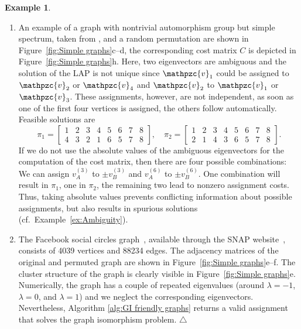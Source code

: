 \documentclass
[
    a4paper,
    DIV=11,
    abstracton
]
{scrartcl}
\newcommand{\mc}[1]{\mathpzc{#1}}
\newcommand\xqed[1]{\leavevmode\unskip\penalty9999 \hbox{}\nobreak\hfill \quad\hbox{#1}}
\newcommand{\exampleSymbol}{\xqed{$\triangle$}}
\theoremstyle{definition}
\newtheorem{example}[theorem]{Example}
\begin{document}
\begin{example}
\begin{enumerate}[leftmargin=0em,itemindent=1.7em,labelsep=0.3em,label=\roman*)]
\item An example of a graph with nontrivial automorphism group but simple spectrum, taken from \cite{FS15}, and a random permutation are shown in Figure~\ref{fig:Simple graphs}c--d, the corresponding cost matrix $ C $ is depicted in Figure~\ref{fig:Simple graphs}h. Here, two eigenvectors are ambiguous and the solution of the LAP is not unique since $ \mc{v}_1 $ could be assigned to $ \mc{v}_2 $ or $ \mc{v}_4 $ and $ \mc{v}_2 $ to $ \mc{v}_1 $ or $ \mc{v}_3 $. These assignments, however, are not independent, as soon as one of the first four vertices is assigned, the others follow automatically. Feasible solutions are
\begin{equation*}
    \pi_1 =
    \begin{bmatrix}
        1 & 2 & 3 & 4 & 5 & 6 & 7 & 8 \\
        4 & 3 & 2 & 1 & 6 & 5 & 7 & 8
    \end{bmatrix}, \quad
    \pi_2 =
    \begin{bmatrix}
        1 & 2 & 3 & 4 & 5 & 6 & 7 & 8 \\
        2 & 1 & 4 & 3 & 6 & 5 & 7 & 8
    \end{bmatrix}.
\end{equation*}
If we do not use the absolute values of the ambiguous eigenvectors for the computation of the cost matrix, then there are four possible combinations: We can assign $ v_A^{(3)} $ to $ \pm v_B^{(3)} $ and $ v_A^{(6)} $ to $ \pm v_B^{(6)} $. One combination will result in $ \pi_1 $, one in $ \pi_2 $, the remaining two lead to nonzero assignment costs. Thus, taking absolute values prevents conflicting information about possible assignments, but also results in spurious solutions (cf.~Example~\ref{ex:Ambiguity}).

\item The Facebook social circles graph~\cite{ML12}, available through the SNAP website~\cite{LK14}, consists of 4039 vertices and 88234 edges. The adjacency matrices of the original and permuted graph are shown in Figure~\ref{fig:Simple graphs}e--f. The cluster structure of the graph is clearly visible in Figure~\ref{fig:Simple graphs}e. Numerically, the graph has a couple of repeated eigenvalues (around $ \lambda = -1 $, $ \lambda = 0 $, and $ \lambda = 1 $) and we neglect the corresponding eigenvectors. Nevertheless, Algorithm \ref{alg:GI friendly graphs} returns a valid assignment that solves the graph isomorphism problem. \exampleSymbol
\end{enumerate}


\end{example}
\end{document}
